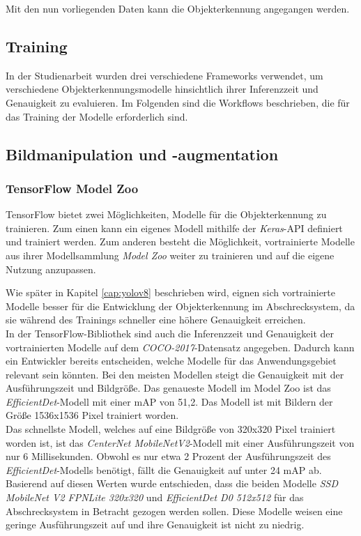 Mit den nun vorliegenden Daten kann die Objekterkennung angegangen werden.

\subsection{Training}

In der Studienarbeit wurden drei verschiedene Frameworks verwendet, um verschiedene Objekterkennungsmodelle hinsichtlich ihrer Inferenzzeit und Genauigkeit zu evaluieren. Im Folgenden sind die Workflows beschrieben, die für das Training der Modelle erforderlich sind.

\subsection{Bildmanipulation und -augmentation}



\subsubsection{TensorFlow Model Zoo} \label{cap:tensorflow}

TensorFlow bietet zwei Möglichkeiten, Modelle für die Objekterkennung zu trainieren. Zum einen kann ein eigenes Modell mithilfe der \textit{Keras}-API definiert und trainiert werden. Zum anderen besteht die Möglichkeit, vortrainierte Modelle aus ihrer Modellsammlung \textit{Model Zoo} weiter zu trainieren und auf die eigene Nutzung anzupassen. 

Wie später in Kapitel \ref{cap:yolov8} beschrieben wird, eignen sich vortrainierte Modelle besser für die Entwicklung der Objekterkennung im Abschrecksystem, da sie während des Trainings schneller eine höhere Genauigkeit erreichen.
\\
In der TensorFlow-Bibliothek sind auch die Inferenzzeit und Genauigkeit der vortrainierten Modelle auf dem \textit{COCO-2017}-Datensatz angegeben. Dadurch kann ein Entwickler bereits entscheiden, welche Modelle für das Anwendungsgebiet relevant sein könnten. Bei den meisten Modellen steigt die Genauigkeit mit der Ausführungszeit und Bildgröße.  Das genaueste Modell im Model Zoo ist das \textit{EfficientDet}-Modell mit einer \ac{mAP} von 51,2. Das Modell ist mit Bildern der Größe 1536x1536 Pixel trainiert worden.
\\
Das schnellste Modell, welches auf eine Bildgröße von 320x320 Pixel trainiert worden ist, ist das \textit{CenterNet MobileNetV2}-Modell mit einer Ausführungszeit von nur 6 Millisekunden. Obwohl es nur etwa 2 Prozent der Ausführungszeit des \textit{EfficientDet}-Modells benötigt, fällt die Genauigkeit auf unter 24 \ac{mAP} ab.
\\
Basierend auf diesen Werten wurde entschieden, dass die beiden Modelle \textit{SSD MobileNet V2 FPNLite 320x320} und \textit{EfficientDet D0 512x512} für das Abschrecksystem in Betracht gezogen werden sollen. Diese Modelle weisen eine geringe Ausführungszeit auf und ihre Genauigkeit ist nicht zu niedrig. \cite{tens_zoo}

